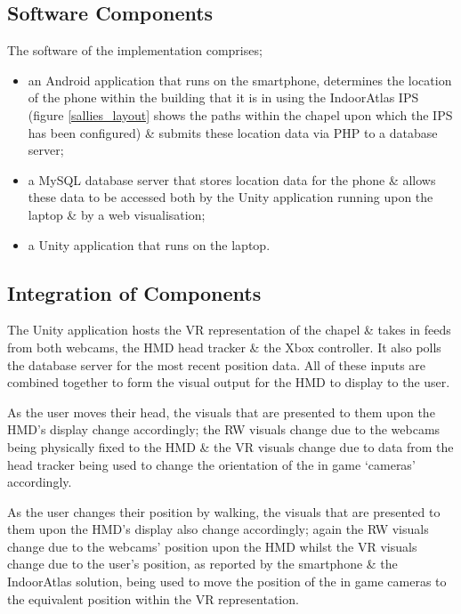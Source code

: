 \subsection{Software Components}
The software of the implementation comprises;

\begin{itemize}
	\item an Android application that runs on the smartphone, determines the location of the phone within the building that it is in using the IndoorAtlas IPS~\cite{IndoorAtlasLtd.2012} (figure \ref{sallies_layout} shows the paths within the chapel upon which the IPS has been configured) \& submits these location data via PHP to a database server;
	\item a MySQL database server that stores location data for the phone \& allows these data to be accessed both by the Unity application running upon the laptop \& by a web visualisation;
	\item a Unity application that runs on the laptop.
\end{itemize}


\subsection{Integration of Components}
The Unity application hosts the VR representation of the chapel \& takes in feeds from both webcams, the HMD head tracker \& the Xbox controller. It also polls the database server for the most recent position data. All of these inputs are combined together to form the visual output for the HMD to display to the user.

As the user moves their head, the visuals that are presented to them upon the HMD's display change accordingly; the RW visuals change due to the webcams being physically fixed to the HMD \& the VR visuals change due to data from the head tracker being used to change the orientation of the in game `cameras' accordingly.

As the user changes their position by walking, the visuals that are presented to them upon the HMD's display also change accordingly; again the RW visuals change due to the webcams' position upon the HMD whilst the VR visuals change due to the user's position, as reported by the smartphone \& the IndoorAtlas solution, being used to move the position of the in game cameras to the equivalent position within the VR representation.

